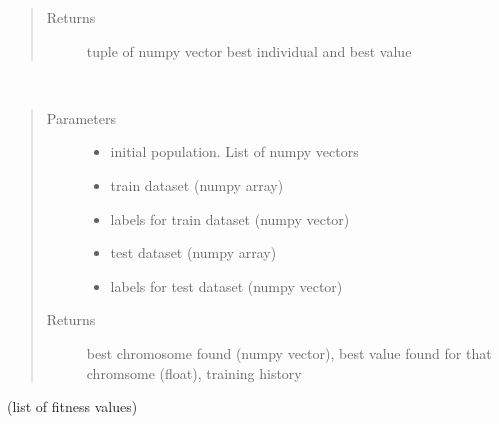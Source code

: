 \documentclass[letterpaper,10pt,english]{sphinxmanual}
\begin{document}
\begin{fulllineitems}
\begin{fulllineitems}
\begin{quote}
\begin{description}
\item[{Returns}] \leavevmode
tuple of numpy vector best individual and best value

\end{description}\end{quote}

\end{fulllineitems}


\begin{fulllineitems}
\label{\detokenize{index:genetic_optimizer.GeneticNeuralOptimizer.fit}}~\begin{quote}\begin{description}
\item[{Parameters}] \leavevmode\begin{itemize}
\item {} 
 \textendash{} initial population. List of numpy vectors

\item {} 
 \textendash{} train dataset (numpy array)

\item {} 
 \textendash{} labels for train dataset (numpy vector)

\item {} 
 \textendash{} test dataset (numpy array)

\item {} 
 \textendash{} labels for test dataset (numpy vector)

\end{itemize}

\item[{Returns}] \leavevmode
best chromosome found (numpy vector), best value found for that chromsome (float), training history

\end{description}\end{quote}

(list of fitness values)


\end{fulllineitems}
\end{fulllineitems}
\end{document}
